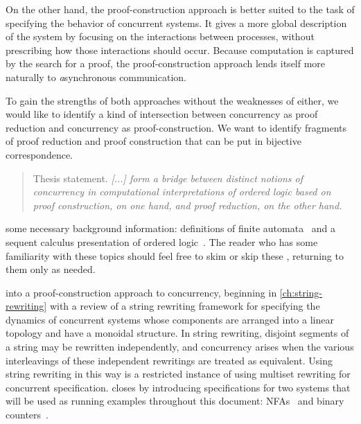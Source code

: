 On the other hand, the proof-construction approach is better suited to the task of specifying the behavior of concurrent systems.
It gives a more global description of the system by focusing on the interactions between processes, without prescribing how those interactions should occur.
Because computation is captured by the search for a proof, the proof-construction approach lends itself more naturally to \emph{a}synchronous communication.

To gain the strengths of both approaches without the weaknesses of either, we would like to identify a kind of intersection between concurrency as proof reduction and concurrency as proof-construction.
We want to identify fragments of proof reduction and proof construction that can be put in bijective correspondence.
\begin{quotation}
  \normalsize
  Thesis statement.
  \itshape [...] form a bridge between distinct notions of concurrency in computational interpretations of ordered logic based on proof construction, on one hand, and proof reduction, on the other hand.
\end{quotation}

 some necessary background information: definitions of finite automata~ and a sequent calculus presentation of ordered logic~.
The reader who has some familiarity with these topics should feel free to skim or skip these , returning to them only as needed.

 into a proof-construction approach to concurrency, beginning in \cref{ch:string-rewriting} with a review of a string rewriting framework for specifying the dynamics of concurrent systems whose components are arranged into a linear topology and have a monoidal structure.
In string rewriting, disjoint segments of a string may be rewritten independently, and concurrency arises when the various interleavings of these independent rewritings are treated as equivalent.
Using string rewriting in this way is 
a restricted instance of using multiset rewriting for concurrent specification.\autocite{Meseguer:TCS92}
 closes by introducing
specifications for two systems that will be used as running examples throughout this document: \aclp*{NFA}~ and binary counters~.


